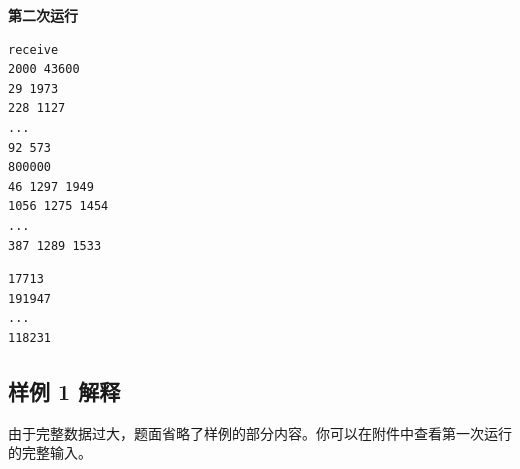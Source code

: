 \textbf{第二次运行}

\begin{minipage}{\linewidth}
	\begin{minipage}[t]{0.49\linewidth}
		\begin{lstlisting}[title=\texttt{standard input}]
receive
2000 43600
29 1973
228 1127
...
92 573
800000
46 1297 1949
1056 1275 1454
...
387 1289 1533
\end{lstlisting}
	\end{minipage}
	\begin{minipage}[t]{0.49\linewidth}
		\begin{lstlisting}[title=\texttt{standard output}]
17713
191947
...
118231
\end{lstlisting}
	\end{minipage}
\end{minipage}


\subsection{样例 1 解释}

由于完整数据过大，题面省略了样例的部分内容。你可以在附件中查看第一次运行的完整输入。


